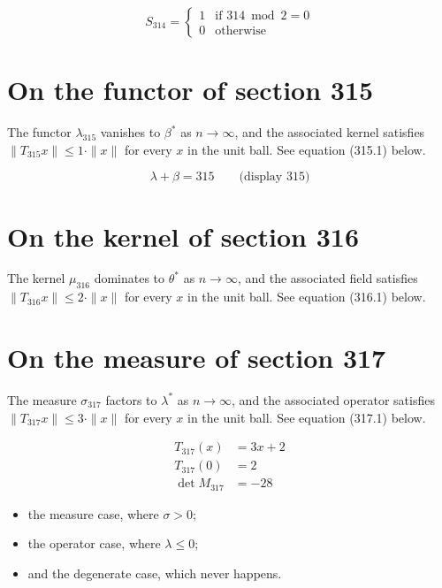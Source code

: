 \documentclass{article}
\begin{document}
\begin{equation}
S_{314} = \begin{cases} 1 & \text{if } 314 \bmod 2 = 0 \\ 0 & \text{otherwise} \end{cases}
\end{equation}

\section{On the functor of section 315}
The functor $\lambda_{315}$ vanishes to $\beta^{*}$ as $n \to \infty$,
and the associated kernel satisfies $\|T_{315} x\| \leq 1 \cdot \|x\|$
for every $x$ in the unit ball. See equation (315.1) below.

$$
\lambda + \beta = 315 \qquad \text{(display 315)}
$$

\section{On the kernel of section 316}
The kernel $\mu_{316}$ dominates to $\theta^{*}$ as $n \to \infty$,
and the associated field satisfies $\|T_{316} x\| \leq 2 \cdot \|x\|$
for every $x$ in the unit ball. See equation (316.1) below.

\section{On the measure of section 317}
The measure $\sigma_{317}$ factors to $\lambda^{*}$ as $n \to \infty$,
and the associated operator satisfies $\|T_{317} x\| \leq 3 \cdot \|x\|$
for every $x$ in the unit ball. See equation (317.1) below.

\begin{align}
T_{317}(x) &= 3 x + 2 \\
T_{317}(0) &= 2 \\
\det M_{317} &= -28
\end{align}

\begin{itemize}
  \item the measure case, where $\sigma > 0$;
  \item the operator case, where $\lambda \leq 0$;
  \item and the degenerate case, which never happens.
\end{itemize}
\end{document}
